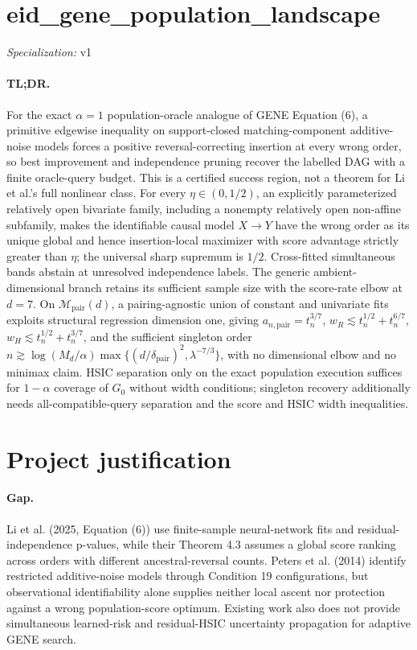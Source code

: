 \documentclass{article}
\begin{document}
\sloppy

\section*{eid\_\allowbreak{}gene\_\allowbreak{}population\_\allowbreak{}landscape}

\noindent\textit{Specialization:} v1\par

\paragraph{TL;DR.} For the exact \(\alpha=1\) population-oracle analogue of GENE Equation (6), a primitive edgewise inequality on support-closed matching-component additive-noise models forces a positive reversal-correcting insertion at every wrong order, so best improvement and independence pruning recover the labelled DAG with a finite oracle-query budget. This is a certified success region, not a theorem for Li et al.'s full nonlinear class. For every \(\eta\in(0,1/2)\), an explicitly parameterized relatively open bivariate family, including a nonempty relatively open non-affine subfamily, makes the identifiable causal model \(X\to Y\) have the wrong order as its unique global and hence insertion-local maximizer with score advantage strictly greater than \(\eta\); the universal sharp supremum is \(1/2\). Cross-fitted simultaneous bands abstain at unresolved independence labels. The generic ambient-dimensional branch retains its sufficient sample size with the score-rate elbow at \(d=7\). On \(\mathcal M_{\mathrm{pair}}(d)\), a pairing-agnostic union of constant and univariate fits exploits structural regression dimension one, giving \(a_{n,\mathrm{pair}}=t_n^{3/7}\), \(w_R\lesssim t_n^{1/2}+t_n^{6/7}\), \(w_H\lesssim t_n^{1/2}+t_n^{3/7}\), and the sufficient singleton order \(n\gtrsim\log(M_d/\alpha)\max\{(d/\delta_{\mathrm{pair}})^2,\lambda^{-7/3}\}\), with no dimensional elbow and no minimax claim. HSIC separation only on the exact population execution suffices for \(1-\alpha\) coverage of \(G_0\) without width conditions; singleton recovery additionally needs all-compatible-query separation and the score and HSIC width inequalities.

\section{Project justification}

\paragraph{Gap.} Li et al. (2025, Equation (6)) use finite-sample neural-network fits and residual-independence p-values, while their Theorem 4.3 assumes a global score ranking across orders with different ancestral-reversal counts. Peters et al. (2014) identify restricted additive-noise models through Condition 19 configurations, but observational identifiability alone supplies neither local ascent nor protection against a wrong population-score optimum. Existing work also does not provide simultaneous learned-risk and residual-HSIC uncertainty propagation for adaptive GENE search.
\end{document}
